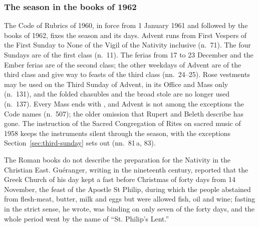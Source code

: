 \subsubsection{The season in the books of 1962}

The Code of Rubrics of 1960, in force from 1 January 1961 and followed by the books of 1962,
fixes the season and its days. Advent runs from First Vespers of the First Sunday to None of the
Vigil of the Nativity inclusive (n.~71). The four Sundays are of the first class (n.~11). The
ferias from 17 to 23 December and the Ember ferias are of the second class; the other weekdays of
Advent are of the third class and give way to feasts of the third class (nn.~24--25). Rose
vestments may be used on the Third Sunday of Advent, in its Office and Mass only (n.~131), and
the folded chasubles and the broad stole are no longer used (n.~137). Every Mass ends with
, and Advent is not among the exceptions the Code names (n.~507); the older
omission that Rupert and Beleth describe has gone. The instruction of the Sacred Congregation of
Rites on sacred music of 1958 keeps the instruments silent through the season, with the
exceptions Section~\ref{sec:third-sunday} sets out (nn.~81\,a, 83).

The Roman books do not describe the preparation for the Nativity in the Christian East.
Guéranger, writing in the nineteenth century, reported that the Greek Church of his
day kept a fast before Christmas of forty days from 14 November, the feast of the Apostle St
Philip, during which the people abstained from flesh-meat, butter, milk and eggs but were allowed
fish, oil and wine; fasting in the strict sense, he wrote, was binding on only seven of the forty
days, and the whole period went by the name of ``St. Philip's Lent.''
